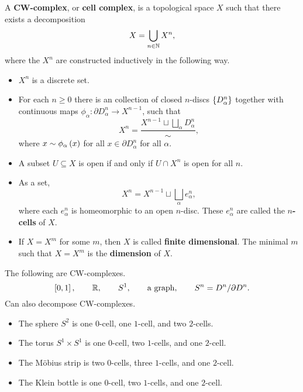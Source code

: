 \begin{definition*}
A \textbf{CW-complex}, or \textbf{cell complex}, is a topological space $ X $ such that there exists a decomposition
$$ X = \bigcup_{n \in \mathbb{N}} X^n, $$
where the $ X^n $ are constructed inductively in the following way.
\begin{itemize}
\item $ X^n $ is a discrete set.
\item For each $ n \ge 0 $ there is an collection of closed $ n $-discs $ \cbr{D_\alpha^n} $ together with continuous maps $ \phi_\alpha : \partial D_\alpha^n \to X^{n - 1} $, such that
$$ X^n = \dfrac{X^{n - 1} \sqcup \bigsqcup_\alpha D_\alpha^n}{\sim}, $$
where $ x \sim \phi_\alpha\br{x} $ for all $ x \in \partial D_\alpha^n $ for all $ \alpha $.
\item A subset $ U \subseteq X $ is open if and only if $ U \cap X^n $ is open for all $ n $.
\end{itemize}
\end{definition*}

\begin{remark*}
\hfill
\begin{itemize}
\item As a set,
$$ X^n = X^{n - 1} \sqcup \bigsqcup_\alpha e_\alpha^n, $$
where each $ e_\alpha^n $ is homeomorphic to an open $ n $-disc. These $ e_\alpha^n $ are called the \textbf{$ n $-cells} of $ X $.
\item If $ X = X^m $ for some $ m $, then $ X $ is called \textbf{finite dimensional}. The minimal $ m $ such that $ X = X^m $ is the \textbf{dimension} of $ X $.
\end{itemize}
\end{remark*}

\begin{example*}
The following are CW-complexes.
$$ \sbr{0, 1}, \qquad \R, \qquad S^1, \qquad \text{a graph}, \qquad S^n = D^n / \partial D^n. $$
Can also decompose CW-complexes.
\begin{itemize}
\item The sphere $ S^2 $ is one $ 0 $-cell, one $ 1 $-cell, and two $ 2 $-cells.
\item The torus $ S^1 \times S^1 $ is one $ 0 $-cell, two $ 1 $-cells, and one $ 2 $-cell.
\item The M\"obius strip is two $ 0 $-cells, three $ 1 $-cells, and one $ 2 $-cell.
\item The Klein bottle is one $ 0 $-cell, two $ 1 $-cells, and one $ 2 $-cell.
\end{itemize}
\end{example*}

